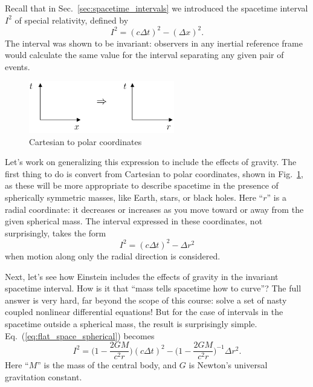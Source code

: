 Recall that in Sec.~\ref{sec:spacetime_intervals} we introduced the
spacetime interval $I^2$ of special relativity, defined by
\begin{equation}
I^2 = (c\Delta t)^2 - (\Delta x)^2.
\end{equation}     
The interval was shown to be invariant: observers in any inertial
reference frame would calculate the same value for the interval
separating any given pair of events.

\begin{figure}[tbp]
\begin{center}
\includegraphics[width=2.5in]{gravity_and_geometry/coordinates.pdf}
\end{center}
\caption{Cartesian to polar coordinates}
\label{fig:cartesian_to_spherical}
\end{figure}

Let's work on generalizing this expression to include the effects of
gravity.  The first thing to do is convert from Cartesian to polar
coordinates, shown in Fig.~\ref{fig:cartesian_to_spherical}, as
these will be more appropriate to describe spacetime in the presence
of spherically symmetric masses, like Earth, stars, or black holes.
Here ``$r$'' is a radial coordinate: it decreases or increases as you
move toward or away from the given spherical mass.  The interval
expressed in these coordinates, not surprisingly, takes the form
\begin{equation}
I^2 =  (c\Delta t)^2 - \Delta r^2
\label{eq:flat_space_spherical}
\end{equation}
when motion along only the radial direction is considered.

Next, let's see how Einstein includes the effects of gravity in the
invariant spacetime interval.  How is it that ``mass tells spacetime
how to curve''?  The full answer is very hard, far beyond the scope of
this course: solve a set of nasty coupled nonlinear differential
equations!  But for the case of intervals in the spacetime outside a
spherical mass, the result is surprisingly simple.
Eq.~(\ref{eq:flat_space_spherical}) becomes
\begin{equation}
  I^2 = \biggl(1-\frac{2GM}{c^2 r}\biggr)(c\Delta t)^2-
  \biggl(1-\frac{2GM}{c^2 r}\biggr)^{-1}\Delta r^2. 
\label{eq:schwarzschild_metric}
\end{equation}
Here ``$M$'' is the mass of the central body, and $G$ is Newton's
universal gravitation constant.

